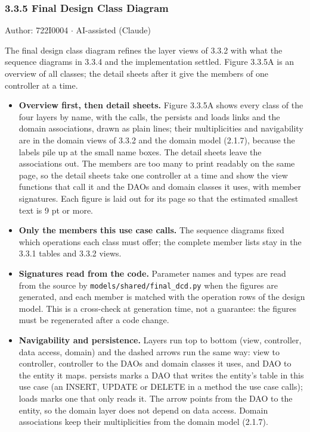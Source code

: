 \subsubsection*{3.3.5 Final Design Class Diagram}
Author: 722I0004 \ensuremath{\cdot} AI-assisted (Claude)

The final design class diagram refines the layer views of 3.3.2 with what the sequence diagrams in 3.3.4 and the implementation settled. Figure 3.3.5A is an overview of all classes; the detail sheets after it give the members of one controller at a time.

\begin{itemize}
\item \textbf{Overview first, then detail sheets.} Figure 3.3.5A shows every class of the four layers by name, with the calls, the \guillemotleft{}persists\guillemotright{} and \guillemotleft{}loads\guillemotright{} links and the domain associations, drawn as plain lines; their multiplicities and navigability are in the domain views of 3.3.2 and the domain model (2.1.7), because the labels pile up at the small name boxes. The detail sheets leave the associations out. The members are too many to print readably on the same page, so the detail sheets take one controller at a time and show the view functions that call it and the DAOs and domain classes it uses, with member signatures. Each figure is laid out for its page so that the estimated smallest text is 9 pt or more.

\item \textbf{Only the members this use case calls.} The sequence diagrams fixed which operations each class must offer; the complete member lists stay in the 3.3.1 tables and 3.3.2 views.

\item \textbf{Signatures read from the code.} Parameter names and types are read from the source by \texttt{models/\allowbreak{}shared/\allowbreak{}final\_\allowbreak{}dcd.\allowbreak{}py} when the figures are generated, and each member is matched with the operation rows of the design model. This is a cross-check at generation time, not a guarantee: the figures must be regenerated after a code change.

\item \textbf{Navigability and persistence.} Layers run top to bottom (view, controller, data access, domain) and the dashed arrows run the same way: view to controller, controller to the DAOs and domain classes it uses, and DAO to the entity it maps. \guillemotleft{}persists\guillemotright{} marks a DAO that writes the entity's table in this use case (an INSERT, UPDATE or DELETE in a method the use case calls); \guillemotleft{}loads\guillemotright{} marks one that only reads it. The arrow points from the DAO to the entity, so the domain layer does not depend on data access. Domain associations keep their multiplicities from the domain model (2.1.7).

\end{itemize}
